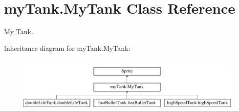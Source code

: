\hypertarget{classmy_tank_1_1_my_tank}{}\section{my\+Tank.\+My\+Tank Class Reference}
\label{classmy_tank_1_1_my_tank}


My Tank.  


Inheritance diagram for my\+Tank.\+My\+Tank\+:\begin{figure}[H]
\begin{center}
\leavevmode
\includegraphics[height=2.828283cm]{classmy_tank_1_1_my_tank}
\end{center}
\end{figure}
